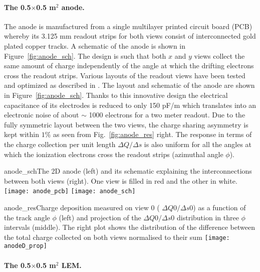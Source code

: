  \paragraph{The 0.5$\times$0.5 m$^2$ anode.}
 The anode is manufactured from a single multilayer printed circuit board (PCB) whereby its 3.125 mm readout strips for both views
 consist of interconnected gold plated copper tracks. A schematic of  the anode is shown in Figure~\ref{fig:anode_sch}. The design is such that
 both $x$ and $y$ views collect the same amount of charge  independently of the angle at which the drifting electrons cross the
 readout strips. Various layouts of the readout views have been tested  and optimized as described in \cite{Cantini:2013yba}. The layout and
 schematic of the anode are shown in Figure~\ref{fig:anode_sch}.  Thanks  to this innovative design the electrical capacitance of its
 electrodes is reduced to only 150 pF/m which translates into an  electronic noise of about $\sim$ 1000 electrons for a two meter
 readout. Due to the fully symmetric layout between the two views, the  charge sharing asymmetry is kept within $1\%$ as seen from
 Fig.~\ref{fig:anode_res} right. The response in terms of the charge  collection per unit length $\Delta Q/\Delta s$ is also uniform for
 all the angles at which the ionization electrons cross the readout strips (azimuthal angle $\phi$).

\begin{cdrfigure}{anode_sch}{The 2D anode (left) and its schematic explaining the
       interconnections between both views (right). One view is filled
       in red and the other in white.}
     \texttt{[image: anode\_pcb]} \hspace{0.2cm} \texttt{[image: anode\_sch]}
\end{cdrfigure}


\begin{cdrfigure}{anode_res}{Charge deposition measured on view 0 ( $\Delta Q0/\Delta s0$) as a function  of the track angle $\phi$ (left) and projection of the  $\Delta Q0/\Delta s0$ distribution in three $\phi$ intervals (middle). The right plot  shows the distribution of the difference between the total charge  collected on both views normalised to their sum}
\texttt{[image: anodeD\_prop]}
\end{cdrfigure}

\paragraph{The 0.5$\times$0.5 m$^2$ LEM.}

